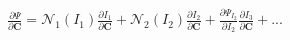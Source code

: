 \documentclass[preview]{standalone}
\begin{document}
\begin{align*}
\frac{\partial \Psi}{\partial \mathbf{C}}  =  \mathcal{N}_1(I_1) \frac{\partial I_1}{\partial \mathbf{C}}  +  \mathcal{N}_2(I_2) \frac{\partial I_2}{\partial \mathbf{C}}  +  \frac{\partial \Psi_{I_2}}{\partial I_2} \frac{\partial I_3}{\partial \mathbf{C}}  + ...
\end{align*}
\end{document}
